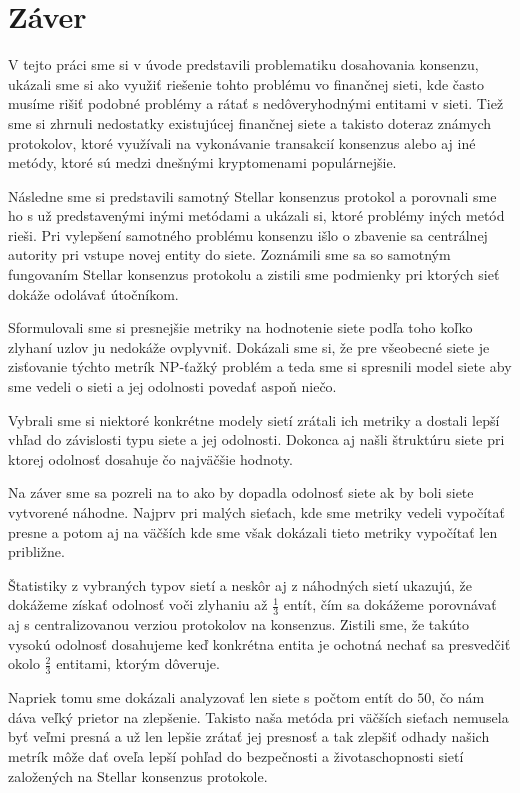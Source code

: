 \chapter*{Záver}  %

V tejto práci sme si v úvode predstavili problematiku dosahovania konsenzu,
ukázali sme si ako využiť riešenie tohto problému vo finančnej sieti, kde
často musíme rišiť podobné problémy a rátať s nedôveryhodnými entitami v sieti.
Tiež sme si zhrnuli nedostatky existujúcej finančnej siete a takisto doteraz
známych protokolov, ktoré využívali na vykonávanie transakcií konsenzus
alebo aj iné metódy, ktoré sú medzi dnešnými kryptomenami populárnejšie.

Následne sme si predstavili samotný Stellar konsenzus protokol a porovnali sme
ho s už predstavenými inými metódami a ukázali si, ktoré problémy iných metód
rieši. Pri vylepšení samotného problému konsenzu išlo o zbavenie sa centrálnej
autority pri vstupe novej entity do siete.
Zoznámili sme sa so samotným fungovaním Stellar konsenzus protokolu a zistili
sme podmienky pri ktorých sieť dokáže odolávať útočníkom.

Sformulovali sme si presnejšie metriky na hodnotenie siete podľa toho koľko
zlyhaní uzlov ju nedokáže ovplyvniť. Dokázali sme si, že pre všeobecné siete
je zisťovanie týchto metrík NP-ťažký problém a teda sme si spresnili model
siete aby sme vedeli o sieti a jej odolnosti povedať aspoň niečo.

Vybrali sme si niektoré konkrétne modely sietí zrátali ich metriky a dostali
lepší vhľad do závislosti typu siete a jej odolnosti. Dokonca aj našli
štruktúru siete pri ktorej odolnosť dosahuje čo najväčšie hodnoty.

Na záver sme sa pozreli na to ako by dopadla odolnosť siete ak by boli siete
vytvorené náhodne. Najprv pri malých sieťach, kde sme metriky vedeli vypočítať
presne a potom aj na väčších kde sme však dokázali tieto metriky vypočítať
len približne.

Štatistiky z vybraných typov sietí a neskôr aj z náhodných sietí ukazujú, že
dokážeme získať odolnosť voči zlyhaniu až $\frac{1}{3}$ entít, čím sa dokážeme
porovnávať aj s centralizovanou verziou protokolov na konsenzus. Zistili sme,
že takúto vysokú odolnosť dosahujeme keď konkrétna entita je ochotná nechať sa
presvedčiť okolo $\frac{2}{3}$ entitami, ktorým dôveruje.

Napriek tomu sme dokázali analyzovať len siete s počtom entít do $50$, čo
nám dáva veľký prietor na zlepšenie. Takisto naša metóda pri väčších sieťach
nemusela byť veľmi presná a už len lepšie zrátať jej presnosť a tak zlepšiť
odhady našich metrík môže dať oveľa lepší pohľad do bezpečnosti a životaschopnosti
sietí založených na Stellar konsenzus protokole.